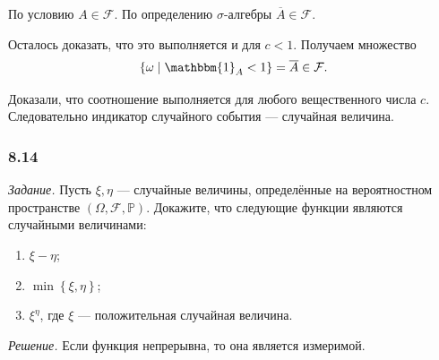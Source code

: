 По условию $A \in \mathcal{F}$.
По определению $ \sigma $-алгебры $ \overline{A} \in \mathcal{F} $.

Осталось доказать, что это выполняется и для $c < 1$.
Получаем множество
$$ \left\{ \omega \; \middle| \;
\mathbbm{1}_A < 1 \right\} =
\overline{A} \in \mathcal{F}.$$

Доказали, что соотношение выполняется для любого вещественного числа $c$.
Следовательно индикатор случайного события --- случайная величина.

\subsubsection*{8.14}

\textit{Задание.} Пусть $ \xi, \eta $ --- случайные величины, определённые на вероятностном пространстве $ \left( \Omega, \mathcal{F}, \mathbb{P} \right) $.
Докажите, что следующие функции являются случайными величинами:
\begin{enumerate}[label=\alph*)]
\item $ \xi - \eta $;
\item $ \min \left\{ \xi, \eta \right\} $;
\item $ \xi^{ \eta } $, где $ \xi $ --- положительная случайная величина.
\end{enumerate}

\textit{Решение.} Если функция непрерывна, то она является измеримой.


